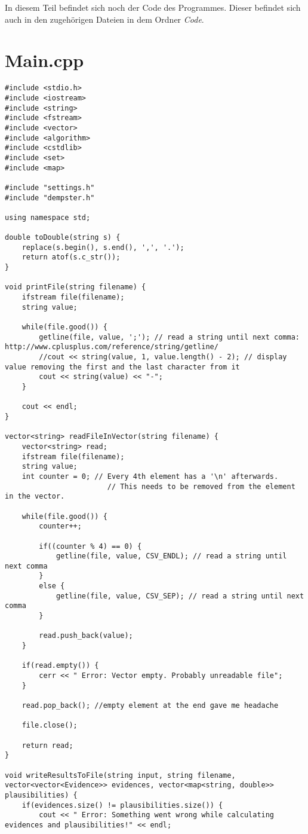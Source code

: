 
\addchap{\langanhang}
In diesem Teil befindet sich noch der Code des Programmes. Dieser befindet sich auch in den zugehörigen Dateien in dem Ordner \textit{Code}.
\section*{Main.cpp}
\begin{lstlisting}[caption=Code aus Main.cpp, label=Bsp.1]
#include <stdio.h>
#include <iostream>
#include <string>
#include <fstream>
#include <vector>
#include <algorithm>
#include <cstdlib>
#include <set>
#include <map>

#include "settings.h"
#include "dempster.h"

using namespace std;

double toDouble(string s) {
	replace(s.begin(), s.end(), ',', '.');
	return atof(s.c_str());
}

void printFile(string filename) {
	ifstream file(filename);
	string value;

	while(file.good()) {
		getline(file, value, ';'); // read a string until next comma: http://www.cplusplus.com/reference/string/getline/
		//cout << string(value, 1, value.length() - 2); // display value removing the first and the last character from it
		cout << string(value) << "-";
	}

	cout << endl;
}

vector<string> readFileInVector(string filename) {
	vector<string> read;
	ifstream file(filename);
	string value;
	int counter = 0; // Every 4th element has a '\n' afterwards. 
						// This needs to be removed from the element in the vector.

	while(file.good()) {
		counter++;

		if((counter % 4) == 0) {
			getline(file, value, CSV_ENDL); // read a string until next comma
		}
		else {
			getline(file, value, CSV_SEP); // read a string until next comma
		}

		read.push_back(value);
	}

	if(read.empty()) {
		cerr << " Error: Vector empty. Probably unreadable file";
	}

	read.pop_back(); //empty element at the end gave me headache

	file.close();

	return read;
}

void writeResultsToFile(string input, string filename, vector<vector<Evidence>> evidences, vector<map<string, double>> plausibilities) {
	if(evidences.size() != plausibilities.size()) {
		cout << " Error: Something went wrong while calculating evidences and plausibilities!" << endl;


\end{lstlisting}
